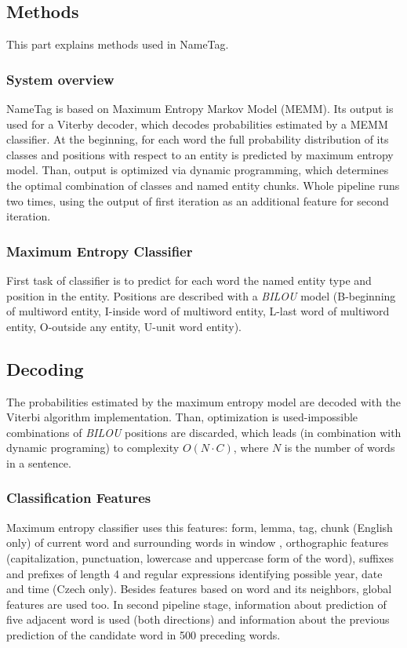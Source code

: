 \subsection{Methods}
This part explains methods used in NameTag. 

\subsubsection{System overview}
NameTag is based on Maximum Entropy Markov Model (MEMM). Its output is used for a Viterby decoder, which decodes probabilities estimated by a MEMM classifier.
At the beginning, for each word the full probability distribution of its classes and positions with respect to an entity is predicted by maximum entropy model. Than, output is optimized via dynamic programming, which determines the optimal combination of classes and named entity chunks.
Whole pipeline runs two times, using the output of first iteration as an additional feature for second iteration.

\subsubsection{Maximum Entropy Classifier}
First task of classifier is to predict for each word the named entity type and position in the entity. Positions are described with a {\it BILOU} model (B-beginning of multiword entity, I-inside word of multiword entity, L-last word of multiword entity, O-outside any entity, U-unit word entity).

\subsection{Decoding}
The probabilities estimated by the maximum entropy model are decoded with the Viterbi algorithm implementation. Than, optimization is used-impossible combinations of {\it BILOU} positions are discarded, which leads (in combination with dynamic programing) to complexity  \(O(N \cdot C)\), where \(N\) is the number of words in a sentence.

\subsubsection{Classification Features}
Maximum entropy classifier uses this features: form, lemma, tag, chunk (English only) of current word and surrounding words in window
, orthographic features (capitalization, punctuation, lowercase and uppercase form of
the word), suffixes and prefixes of length 4 and regular expressions identifying possible
year, date and time (Czech only).
Besides features based on word and its neighbors, global features are used too. In second pipeline stage, information about prediction of five adjacent word is used (both directions) and information about the previous prediction of the candidate word in 500 preceding words.

